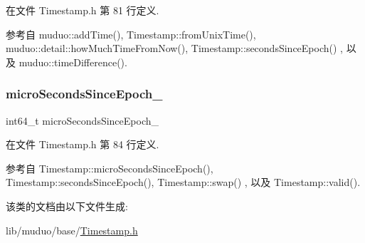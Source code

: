 在文件 Timestamp.\+h 第 81 行定义.



参考自 muduo\+::add\+Time(), Timestamp\+::from\+Unix\+Time(), muduo\+::detail\+::how\+Much\+Time\+From\+Now(), Timestamp\+::seconds\+Since\+Epoch() , 以及 muduo\+::time\+Difference().

\mbox{\label{classmuduo_1_1Timestamp_ad36b5d1f504a660a5e4386588d27346d}} 
\subsubsection{\texorpdfstring{micro\+Seconds\+Since\+Epoch\+\_\+}{microSecondsSinceEpoch\_}}
{\footnotesize\ttfamily int64\+\_\+t micro\+Seconds\+Since\+Epoch\+\_\+\hspace{0.3cm}{\ttfamily [private]}}



在文件 Timestamp.\+h 第 84 行定义.



参考自 Timestamp\+::micro\+Seconds\+Since\+Epoch(), Timestamp\+::seconds\+Since\+Epoch(), Timestamp\+::swap() , 以及 Timestamp\+::valid().



该类的文档由以下文件生成\+:\begin{DoxyCompactItemize}
\item 
lib/muduo/base/\hyperlink{Timestamp_8h}{Timestamp.\+h}\end{DoxyCompactItemize}
